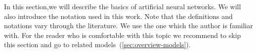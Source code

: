 
\newcommand{\argmin}{\operatornamewithlimits{arg\,min}}
\newcommand{\Bx}{{\bf x} }
\newcommand{\By}{{\bf y} }
\newcommand{\Bh}{{\bf h} }
\newcommand{\Bw}{{\bf w} }
\newcommand{\Bc}{{\bf c} }

In this section,we will describe the basics of artificial neural networks. We will also introduce the notation used in this work. Note that the definitions and notations vary through the literature. We use the one which the author is familiar with. For the reader who is comfortable with this topic we recommend to skip this section and go to related models~(\ref{sec:overview-models}). 

 
\label{sec:perceptron} 



 

 
